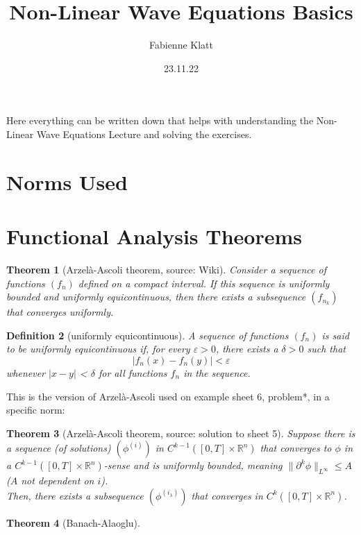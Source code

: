 \documentclass[12pt,a4paper]{article}
\title{Non-Linear Wave Equations Basics}
\author{Fabienne Klatt}
\date{23.11.22}
\newtheorem{definition}{Definition}
\newtheorem{thm}[definition]{Theorem}
\begin{document}
\tableofcontents
\thispagestyle{empty}

\clearpage

Here everything can be written down that helps with understanding the Non-Linear Wave Equations Lecture and solving the exercises.

\section{Norms Used}

\section{Functional Analysis Theorems}

\begin{thm}[Arzelà-Ascoli theorem, source: Wiki]
Consider a sequence of functions $(f_n)$ defined on a compact interval. If this sequence is uniformly bounded and uniformly equicontinuous, then there exists a subsequence $(f_{n_k})$ that converges uniformly.
\end{thm}

\begin{definition}[uniformly equicontinuous]
A sequence of functions $(f_n)$ is said to be uniformly equicontinuous if, for every $\varepsilon > 0$, there exists a $\delta > 0$ such that
\begin{equation}
\left|f_{n}(x)-f_{n}(y)\right|<\varepsilon
\end{equation}
whenever $| x-y |$ < $\delta$ for all functions $f_n$ in the sequence.
\end{definition}

This is the version of Arzelà-Ascoli used on example sheet 6, problem*, in a specific norm:

\begin{thm}[Arzelà-Ascoli theorem, source: solution to sheet 5]
Suppose there is a sequence (of solutions) $(\phi^{(i)})$ in $C^{k-1}([0,T]\times \mathbb{R}^n)$ that converges to $\phi$ in a $C^{k-1}([0,T]\times \mathbb{R}^n)$-sense and is uniformly bounded, meaning $\lVert \partial ^k \phi \rVert _{L^{\infty}} \leq A$ ($A$ not dependent on $i$).\\
Then, there exists a subsequence $(\phi^{(i_{\lambda})})$ that converges in $C^{k}([0,T]\times \mathbb{R}^n)$.
\end{thm}

\begin{thm}[Banach-Alaoglu]
\end{thm}
\end{document}
